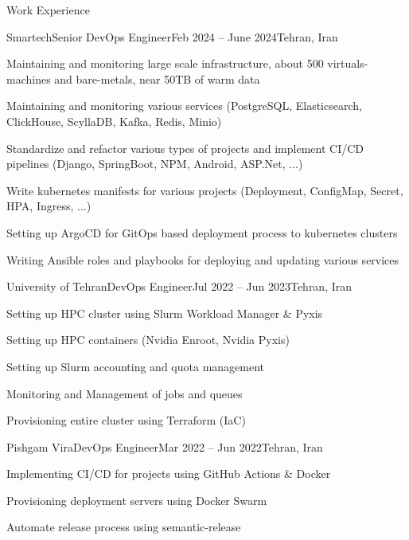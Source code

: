 \documentclass[]{main}
\begin{document}
\begin{section}{Work Experience}
 \begin{subsection}{Smartech}{Senior DevOps Engineer}{Feb 2024 -- June 2024}{Tehran, Iran}
     \item Maintaining and monitoring large scale infrastructure, about 500 virtuals-machines and bare-metals, near 50TB of warm data
     \item Maintaining and monitoring various services (PostgreSQL, Elasticsearch, ClickHouse, ScyllaDB, Kafka, Redis, Minio)
     \item Standardize and refactor various types of projects and implement CI/CD pipelines (Django, SpringBoot, NPM, Android, ASP.Net, ...)
     \item Write kubernetes manifests for various projects (Deployment, ConfigMap, Secret, HPA, Ingress, ...)
     \item Setting up ArgoCD for GitOps based deployment process to kubernetes clusters
     \item Writing Ansible roles and playbooks for deploying and updating various services
 \end{subsection}

 \begin{subsection}{University of Tehran}{DevOps Engineer}{Jul 2022 -- Jun 2023}{Tehran, Iran}
     \item Setting up HPC cluster using Slurm Workload Manager \& Pyxis
     \item Setting up HPC containers (Nvidia Enroot, Nvidia Pyxis)
     \item Setting up Slurm accounting and quota management
     \item Monitoring and Management of jobs and queues
     \item Provisioning entire cluster using Terraform (IaC)
 \end{subsection}

 \begin{subsection}{Pishgam Vira}{DevOps Engineer}{Mar 2022 -- Jun 2022}{Tehran, Iran}
     \item Implementing CI/CD for projects using GitHub Actions \& Docker
     \item Provisioning deployment servers using Docker Swarm
     \item Automate release process using semantic-release
 \end{subsection}


\end{section}
\end{document}
